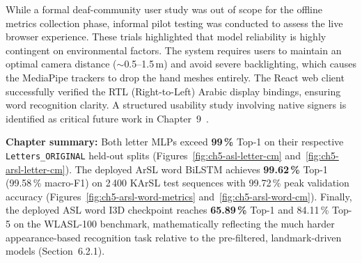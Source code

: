 \noindent While a formal deaf-community user study was out of scope for the offline metrics collection phase, informal pilot testing was conducted to assess the live browser experience. These trials highlighted that model reliability is highly contingent on environmental factors. The system requires users to maintain an optimal camera distance ($\sim$0.5--1.5\,m) and avoid severe backlighting, which causes the MediaPipe trackers to drop the hand meshes entirely. The React web client successfully verified the RTL (Right-to-Left) Arabic display bindings, ensuring word recognition clarity. A structured usability study involving native signers is identified as critical future work in Chapter~9~\cite{wcag22}.\par\vspace{0.4cm}

\noindent\textbf{Chapter summary:} Both letter MLPs exceed \textbf{99\,\%} Top-1 on their respective \texttt{Letters\_ORIGINAL} held-out splits (Figures~\ref{fig:ch5-asl-letter-cm} and~\ref{fig:ch5-arsl-letter-cm}). The deployed ArSL word BiLSTM achieves \textbf{99.62\,\%} Top-1 (99.58\,\% macro-F1) on 2\,400 KArSL test sequences with 99.72\,\% peak validation accuracy (Figures~\ref{fig:ch5-arsl-word-metrics} and~\ref{fig:ch5-arsl-word-cm}). Finally, the deployed ASL word I3D checkpoint reaches \textbf{65.89\,\%} Top-1 and 84.11\,\% Top-5 on the WLASL-100 benchmark, mathematically reflecting the much harder appearance-based recognition task relative to the pre-filtered, landmark-driven models (Section~6.2.1).\par

\clearpage